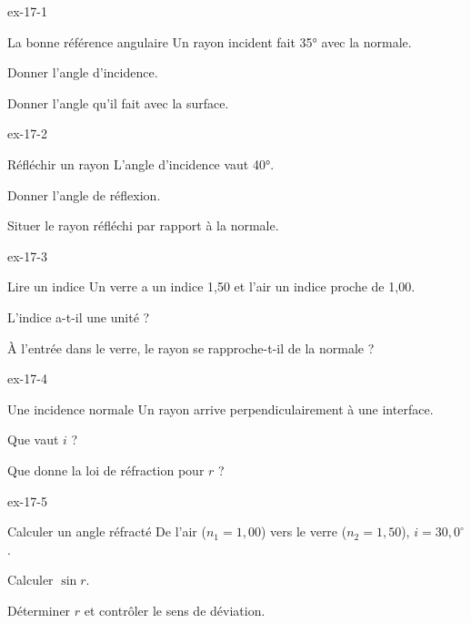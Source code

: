 \exercices
{}
\begin{blocLivre}{ex-17-1}\begin{exercice}[1]{La bonne référence angulaire}
Un rayon incident fait 35° avec la normale.
\begin{questions}
\item Donner l’angle d’incidence.
\item Donner l’angle qu’il fait avec la surface.
\end{questions}
\end{exercice}\end{blocLivre}
\begin{blocLivre}{ex-17-2}\begin{exercice}[1]{Réfléchir un rayon}
L’angle d’incidence vaut 40°.
\begin{questions}
\item Donner l’angle de réflexion.
\item Situer le rayon réfléchi par rapport à la normale.
\end{questions}
\end{exercice}\end{blocLivre}
\begin{blocLivre}{ex-17-3}\begin{exercice}[1]{Lire un indice}
Un verre a un indice 1,50 et l’air un indice proche de 1,00.
\begin{questions}
\item L’indice a-t-il une unité ?
\item À l’entrée dans le verre, le rayon se rapproche-t-il de la normale ?
\end{questions}
\end{exercice}\end{blocLivre}
\begin{blocLivre}{ex-17-4}\begin{exercice}[1]{Une incidence normale}
Un rayon arrive perpendiculairement à une interface.
\begin{questions}
\item Que vaut $i$ ?
\item Que donne la loi de réfraction pour $r$ ?
\end{questions}
\end{exercice}\end{blocLivre}
\begin{blocLivre}{ex-17-5}\begin{exercice}[2]{Calculer un angle réfracté}
De l’air ($n_1=1,00$) vers le verre ($n_2=1,50$), $i=30,0^\circ$.
\begin{questions}
\item Calculer $\sin r$.
\item Déterminer $r$ et contrôler le sens de déviation.
\end{questions}
\end{exercice}\end{blocLivre}
